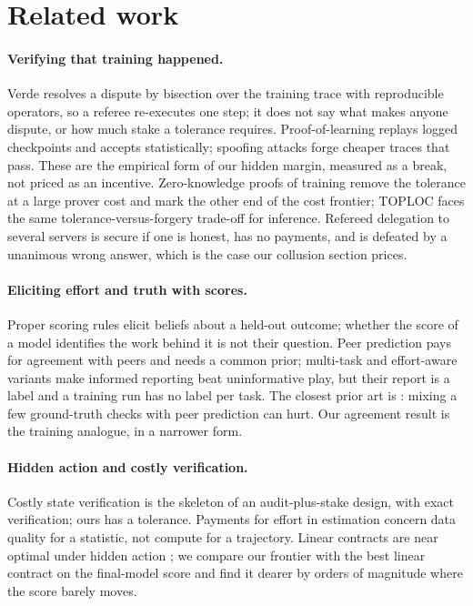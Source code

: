 \documentclass[sigconf,anonymous]{acmart}
\begin{document}
\section{Related work}
\paragraph{Verifying that training happened.}
Verde \cite{arun2025verde} resolves a dispute by bisection over the training trace with reproducible operators, so a referee
re-executes one step; it does not say what makes anyone dispute, or how much stake a tolerance requires.
Proof-of-learning \cite{jia2021pol} replays logged checkpoints and accepts statistically; spoofing attacks
\cite{zhang2021advpol,fang2022pol} forge cheaper traces that pass. These are the empirical form of our hidden margin, measured as
a break, not priced as an incentive. Zero-knowledge proofs of training \cite{abbaszadeh2024zkpot} remove the tolerance at a
large prover cost and mark the other end of the cost frontier; TOPLOC \cite{ong2025toploc} faces the same tolerance-versus-forgery
trade-off for inference. Refereed delegation to several servers \cite{canetti2011} is secure if one is honest, has no payments,
and is defeated by a unanimous wrong answer, which is the case our collusion section prices.

\paragraph{Eliciting effort and truth with scores.}
Proper scoring rules \cite{gneiting2007} elicit beliefs about a held-out outcome; whether the score of a model identifies the work
behind it is not their question. Peer prediction \cite{miller2005,prelec2004} pays for agreement with peers and needs a common prior;
multi-task and effort-aware variants \cite{dasgupta2013,shnayder2016,kong2019} make informed reporting beat uninformative play, but
their report is a label and a training run has no label per task. The closest prior art is \citet{gao2016peer}: mixing a few
ground-truth checks with peer prediction can hurt. Our agreement result is the training analogue, in a narrower form.

\paragraph{Hidden action and costly verification.}
Costly state verification \cite{townsend1979} is the skeleton of an audit-plus-stake design, with exact verification; ours has a
tolerance. Payments for effort in estimation \cite{cai2015} concern data quality for a statistic, not compute for a trajectory.
Linear contracts are near optimal under hidden action \cite{duetting2019simple}; we compare our frontier with the best linear
contract on the final-model score and find it dearer by orders of magnitude where the score barely moves.
\end{document}
